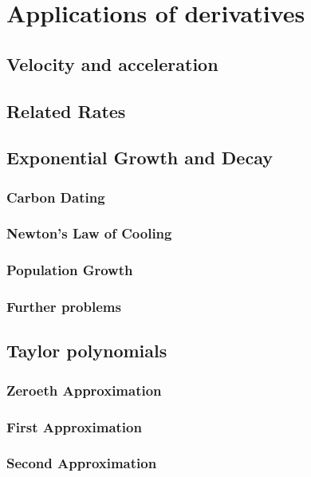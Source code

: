\documentclass[12pt,letterpaper]{book}
\begin{document}
\chapter{Applications of derivatives}
\section{Velocity and acceleration}

\section{Related Rates}

\section{Exponential Growth and Decay}
\subsection{Carbon Dating}

\subsection{Newton's Law of Cooling}

\subsection{Population Growth}

\subsection{Further problems}

\section{Taylor polynomials}
\subsection{Zeroeth Approximation}

\subsection{First Approximation}

\subsection{Second Approximation}

\end{document}

